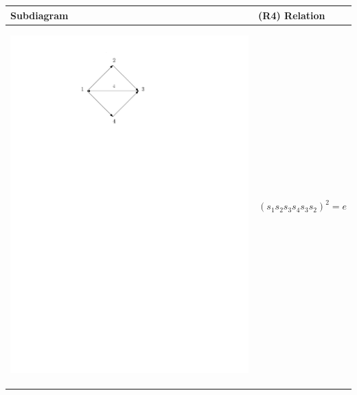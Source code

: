 \documentclass[11pt]{amsart}
\theoremstyle{definition}
\begin{document}
\begin{table}[h] 
\begin{tabular}{| p{3.5cm} | p{7cm} |}
\hline
Subdiagram & (R4) Relation \\ \hline
\begin{center}\includegraphics[scale = .30]{Diagram1.pdf}\end{center} & $(s_{1}s_{2}s_{3}s_{4}s_{3}s_{2})^{2} = e$ \\ \hline


\end{tabular}
\end{table}
\end{document}
